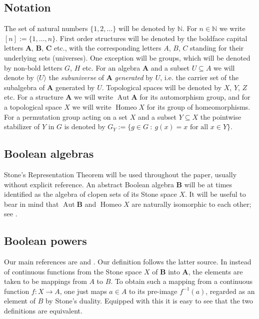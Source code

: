 \documentclass[12pt,a4paper,reqno]{amsart}
\numberwithin{equation}{section}
\theoremstyle{plain}
\theoremstyle{definition}
\newcommand{\A}{\mathbf{A}}
\newcommand{\B}{\mathbf{B}}
\newcommand{\C}{\mathbf{C}}
\newcommand{\N}{\mathbb{N}}
\DeclareMathOperator{\Aut}{Aut}
\DeclareMathOperator{\Homeo}{Homeo}
\newcommand{\st}{\: :\:}
\begin{document}
 
  \subsection{Notation}
  The set of natural numbers $\{1,2,\dots\}$ will be denoted by $\N$.
 For $n\in\N$ we write $[n] := \{1,\dots,n\}$.
First order structures will be denoted by the boldface capital letters $\A$, $\B$, $\C$ etc.,
with the corresponding letters $A$, $B$, $C$ standing for their underlying sets (universes). One exception will be groups, which will be denoted by non-bold letters
$G$, $H$ etc. 
For an algebra $\A$ and a subset $U\subseteq A$ we will denote by $\langle U\rangle$ the \emph{subuniverse} of $\A$ \emph{generated} by $U$, i.e. the carrier set of the subalgebra of $\A$ generated by $U$.
Topological spaces will be denoted by $X$, $Y$, $Z$ etc. For a structure $\A$ we will write $\Aut\A$ for its automorphism group, and for a topological space $X$ we will write $\Homeo X$ for its group of homeomorphisms. For a permutation group acting on a set $X$ and a subset $Y\subseteq X$ the pointwise stabilizer of $Y$ in $G$ is denoted by
$G_Y  := \{ g\in G \st g(x)=x \text{ for all } x\in Y \}$.
 

\subsection{Boolean algebras}

Stone's Representation Theorem will be used throughout the paper, usually without explicit reference. An abstract Boolean algebra $\B$ will be at times identified as the algebra of clopen sets of its Stone space $X$.
It will be useful to bear in mind that $\Aut\B$ and $\Homeo X$ are naturally isomorphic to each other; see \cite[Theorem 8.2]{Mo:HBA1}.

\subsection{Boolean powers}

Our main references are \cite{Bu:BP} and \cite[Section IV.5]{BS:CUA}.
Our definition follows the latter source.
In \cite{Bu:BP} instead of continuous functions from the Stone space $X$ of $\B$ into $\A$, the elements are taken to be
mappings from $A$ to $B$. To obtain such a mapping from a continuous function $f\colon X\rightarrow A$, one just maps
$a\in A$ to its pre-image $f^{-1}(a)$, regarded as an element of $B$ by Stone's duality. Equipped with this it is easy to
see that the two definitions are equivalent.
\end{document}

